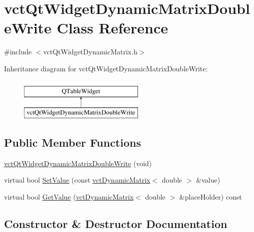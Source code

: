 \hypertarget{classvct_qt_widget_dynamic_matrix_double_write}{}\section{vct\+Qt\+Widget\+Dynamic\+Matrix\+Double\+Write Class Reference}
\label{classvct_qt_widget_dynamic_matrix_double_write}


{\ttfamily \#include $<$vct\+Qt\+Widget\+Dynamic\+Matrix.\+h$>$}

Inheritance diagram for vct\+Qt\+Widget\+Dynamic\+Matrix\+Double\+Write\+:\begin{figure}[H]
\begin{center}
\leavevmode
\includegraphics[height=2.000000cm]{d7/ddf/classvct_qt_widget_dynamic_matrix_double_write}
\end{center}
\end{figure}
\subsection*{Public Member Functions}
\begin{DoxyCompactItemize}
\item 
\hyperlink{classvct_qt_widget_dynamic_matrix_double_write_a1990081770d88bdd6b4ed6e22c54cb4d}{vct\+Qt\+Widget\+Dynamic\+Matrix\+Double\+Write} (void)
\item 
virtual bool \hyperlink{classvct_qt_widget_dynamic_matrix_double_write_aa3c07ce66d5f1add422f431c34e064b5}{Set\+Value} (const \hyperlink{classvct_dynamic_matrix}{vct\+Dynamic\+Matrix}$<$ double $>$ \&value)
\item 
virtual bool \hyperlink{classvct_qt_widget_dynamic_matrix_double_write_ab48173a491bf09a95487f5694a684d70}{Get\+Value} (\hyperlink{classvct_dynamic_matrix}{vct\+Dynamic\+Matrix}$<$ double $>$ \&place\+Holder) const 
\end{DoxyCompactItemize}


\subsection{Constructor \& Destructor Documentation}
\hypertarget{classvct_qt_widget_dynamic_matrix_double_write_a1990081770d88bdd6b4ed6e22c54cb4d}{}
